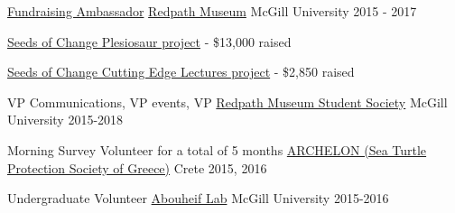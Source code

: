 

\begin{cventries}

  \cventry
    {\href{https://www.youtube.com/channel/UCPDmodXhx7DcY5j6-_ZjjKA/featured}{Fundraising Ambassador}} %
    {\href{https://www.mcgill.ca/redpath/}{Redpath Museum}} %
    {McGill University} %
    {2015 - 2017} %
    {
      \begin{cvitems} %
        \item {\href{https://www.mcgill.ca/seedsofchange/project/redpath-museum-plesiosaur}{Seeds of Change Plesiosaur project} - \$13,000 raised}
        \item {\href{https://www.mcgill.ca/seedsofchange/project/cutting-edge-lecture-series-project}{Seeds of Change Cutting Edge Lectures project} - \$2,850 raised}
      \end{cvitems}
    }

  \cventry
    {VP Communications, VP events, VP} %
    {\href{https://redpathmuseumsociety.weebly.com/}{Redpath Museum Student Society}} %
    {McGill University} %
    {2015-2018} %
    {}

  \vspace{-8pt}
  \cventry
    {Morning Survey Volunteer for a total of 5 months} %
    {\href{https://www.archelon.gr/index_eng.php}{ARCHELON (Sea Turtle Protection Society of Greece)}} %
    {Crete} %
    {2015, 2016} %
    {}

  \vspace{-8pt}
  \cventry
    {Undergraduate Volunteer} %
    {\href{https://www.abouheiflab.org/}{Abouheif Lab}} %
    {McGill University} %
    {2015-2016} %
    {}


\end{cventries}
